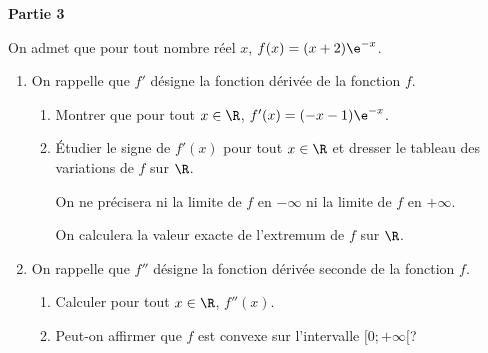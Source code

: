 \medskip

\textbf{Partie 3}

\medskip

On admet que pour tout nombre réel $x$, $f(x) = (x + 2)\e^{-x}$.

\begin{enumerate}
	\item On rappelle que $f'$ désigne la fonction dérivée de la fonction $f$.
	\begin{enumerate}
		\item Montrer que pour tout $x \in \R$, $f'(x) = (-x - 1) \e^{-x}$.
		\item Étudier le signe de $f'(x)$ pour tout $x \in \R$ et dresser le tableau des variations de $f$ sur $\R$.
		
		On ne précisera ni la limite de $f$ en $- \infty$ ni la limite de $f$ en $+ \infty$.
		
		On calculera la valeur exacte de l'extremum de $f$ sur $\R$.
	\end{enumerate}
	\item On rappelle que $f''$ désigne la fonction dérivée seconde de la fonction $f$.
	\begin{enumerate}
		\item Calculer pour tout $x \in \R$, $f''(x)$.
		\item Peut-on affirmer que $f$ est convexe sur l'intervalle $[0;+\infty[$?
	\end{enumerate}
\end{enumerate}

